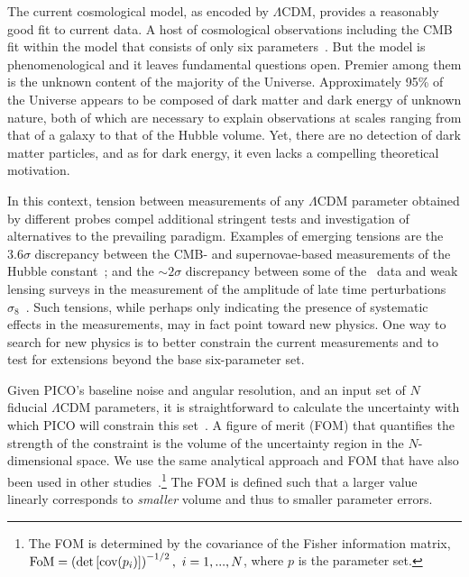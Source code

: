 \documentclass[PICOReport.tex]{subfiles}
\begin{document}

The current cosmological model, as encoded by $\Lambda$CDM, provides a reasonably good fit to current data. A host of cosmological observations including the CMB fit within the model that consists of only six parameters~\citep{Planck2018_I}. But the model is phenomenological and it leaves fundamental questions open. Premier among them is the unknown content of the majority of the Universe. Approximately 95\% of the Universe appears to be composed of dark matter and dark energy of unknown nature, both of which are necessary to explain observations at scales ranging from that of a galaxy to that of the Hubble volume. Yet, there are no detection of dark matter particles, and as for dark energy, it even lacks a compelling theoretical motivation.

In this context, tension between measurements of any $\Lambda$CDM parameter obtained by different probes compel additional stringent tests and investigation of alternatives to the prevailing paradigm. Examples of emerging tensions are the $3.6\sigma$ discrepancy between the CMB- and supernovae-based measurements of the Hubble constant~\citep{Aghanim:2018eyx,Riess2018}; and the $\sim 2\sigma$ discrepancy between some of the \planck\ data and weak lensing surveys in the  measurement of the amplitude of late time perturbations $\sigma_{8}$~\citep{??}. Such tensions, while perhaps only indicating the presence of systematic effects in the measurements, may in fact point toward new physics. One way to search for new physics is to better constrain the current measurements and to test for extensions beyond the base six-parameter set. 

Given PICO's baseline noise and angular resolution, and an input set of $N$ fiducial $\Lambda$CDM parameters, it is straightforward to calculate the uncertainty with which PICO will constrain this set~\citep{core_parameter}. A figure of merit (FOM) that quantifies the strength of the constraint is the volume of the uncertainty region in the $N$-dimensional space. We use the same analytical approach and FOM that have also been used in other studies~\cite{core_parameter,Wang2008,pdg2018,Namikawa2010}.\footnote{The FOM is determined by the covariance of the Fisher information matrix, ${\rm FoM} = \left( \det \left[ \mbox{cov} ( p_i)  \right] \right)^{-1/2},\,\, i=1, ..., N$, where $p$ is the parameter set.} The FOM is defined such that a larger value linearly corresponds to {\it smaller} volume and thus to smaller parameter errors. 
\end{document}
